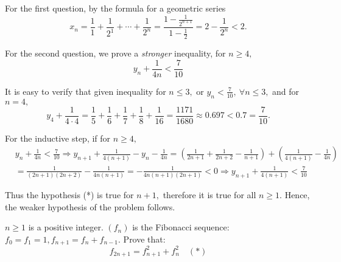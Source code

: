 \documentclass{article}
\begin{document}
\begin{soln}
    For the first question, by the formula for a geometric series
    \[
        x_n = \frac{1}{1} + \frac{1}{2^1} + \cdots + \frac{1}{2^n} = \frac{1-\frac{1}{2^{n+1}}}{1-\frac{1}{2}} = 2 - \frac{1}{2^n} < 2.
    \]

    For the second question, we prove a \textit{stronger} inequality, for $n \ge 4,$
    \[
        y_n + \frac{1}{4n} < \frac{7}{10}
    \]

    It is easy to verify that given inequality for $n \le 3,$ or $y_n < \frac{7}{10},\ \forall n \le 3,$ and for $n=4,$
    \[
        y_4 + \frac{1}{4\cdot 4} = \frac{1}{5} + \frac{1}{6} + \frac{1}{7} + \frac{1}{8} + \frac{1}{16} = \frac{1171}{1680} \approx 0.697 < 0.7 = \frac{7}{10}.
    \]

    For the inductive step, if for $n \ge 4,$
    \[
        \begin{aligned}
            &y_n + \frac{1}{4n} < \frac{7}{10}
            \Rightarrow
            y_{n+1} + \frac{1}{4(n+1)} - y_n - \frac{1}{4n} 
            = \left(\frac{1}{2n+1} + \frac{1}{2n+2} - \frac{1}{n+1}\right) + \left(\frac{1}{4(n+1)} - \frac{1}{4n}\right)\\
            &= \frac{1}{(2n+1)(2n+2)} - \frac{1}{4n(n+1)} = - \frac{1}{4n(n+1)(2n+1)} < 0
            \Rightarrow  y_{n+1} + \frac{1}{4(n+1)} < \frac{7}{10}
        \end{aligned}
    \]

    Thus the hypothesis (*) is true for $n+1,$ therefore it is true for all $n \ge 1.$
    Hence, the weaker hypothesis of the problem follows.
\end{soln}

\begin{problem}
    $n \ge 1$ is a positive integer. $(f_n)$ is the Fibonacci sequence: $f_0 = f_1 = 1, f_{n+1} = f_n + f_{n-1}.$ Prove that:
    \[
        f_{2n+1} = f_{n+1}^2 + f_{n}^2 \quad (*)
    \]
\end{problem}
\end{document}
